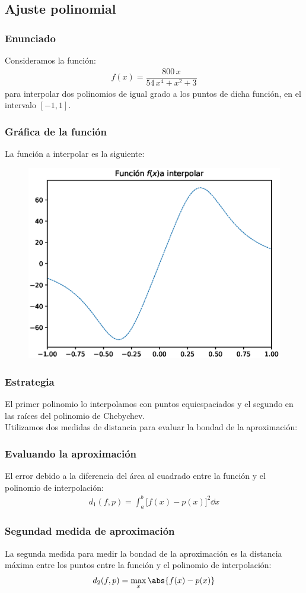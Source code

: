 \subsection{Ajuste polinomial}
\begin{frame}
\frametitle{Enunciado}
Consideramos la función:
\begin{align*}
f(x) = \dfrac{800 \, x}{54 \, x^{4} + x^{2} + 3}
\end{align*}
para interpolar dos polinomios de igual grado a los puntos de dicha función, en el intervalo $[-1, 1]$.
\end{frame}
\begin{frame}
\frametitle{Gráfica de la función}
La función a interpolar es la siguiente:
\begin{figure}
    \centering
    \includegraphics[scale=0.5]{Imagenes/Plot_Ejercicio_Chebychev_01.eps}
\end{figure}
\end{frame}
\begin{frame}
\frametitle{Estrategia}   
El primer polinomio lo interpolamos con puntos equiespaciados y el segundo en las raíces del polinomio de Chebychev.
\\
\bigskip
\pause
Utilizamos dos medidas de distancia para evaluar la bondad de la aproximación:
\end{frame}
\begin{frame}
\frametitle{Evaluando la aproximación}
El error debido a la diferencia del área al cuadrado entre la función y el polinomio de interpolación:
\begin{align*}
d_{1} (f, p) = \int_{a}^{b} \big[ f(x) - p(x) \big]^{2} \dd{x}
\end{align*}
\end{frame}
\begin{frame}
\frametitle{Segundad medida de aproximación}
La segunda medida para medir la bondad de la aproximación es la distancia máxima entre los puntos entre la función y el polinomio de interpolación:
\begin{align*}
d_{2} (f, p) = \max_{x} \abs{f(x) - p(x)}
\end{align*}
\end{frame}
